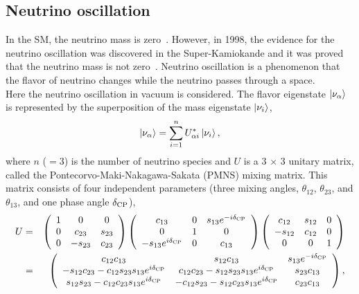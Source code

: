 \subsection{Neutrino oscillation}
\vs\hs In the SM, the neutrino mass is zero~\cite{2022Workman}.
However, in 1998, the evidence for the neutrino oscillation was discovered in the Super-Kamiokande and it was proved that the neutrino mass is not zero~\cite{1998Fukuda}.
Neutrino oscillation is a phenomenon that the flavor of neutrino changes while the neutrino passes through a space.\\
\hs Here the neutrino oscillation in vacuum is considered.
The flavor eigenstate $\ket{\nu_{\alpha}}$ is represented by the superposition of the mass eigenstate $\ket{\nu_{i}}$,
\begin{eqnarray}
	\ket{\nu_{\alpha}}=\sum_{i=1}^{n} U_{\alpha i}^{*}\ket{\nu_{i}},
\end{eqnarray}
where $n$ ($=3$) is the number of neutrino species and $U$ is a 3$\,\times\,$3 unitary matrix, called the Pontecorvo-Maki-Nakagawa-Sakata (PMNS) mixing matrix.
This matrix consists of four independent parameters (three mixing angles, $\theta_{12}$, $\theta_{23}$, and $\theta_{13}$, and one phase angle $\delta_{{\rm CP}}$),
\begin{eqnarray}
	U&=&\left(
	\begin{array}{ccc}
		1&0&0\\
		0&c_{23}&s_{23}\\
		0&-s_{23}&c_{23}
	\end{array}
	\right)
	\left(
	\begin{array}{ccc}
		c_{13}&0&s_{13}e^{-i\delta_{{\rm CP}}}\\
		0&1&0\\
		-s_{13}e^{i\delta_{{\rm CP}}}&0&c_{13}
	\end{array}
	\right)
	\left(
	\begin{array}{ccc}
		c_{12}&s_{12}&0\\
		-s_{12}&c_{12}&0\\
		0&0&1
	\end{array}
	\right) \nonumber \\
	&=&\left(
	\begin{array}{ccc}
		c_{12}c_{13}&s_{12}c_{13}&s_{13}e^{-i\delta_{{\rm CP}}}\\
		-s_{12}c_{23}-c_{12}s_{23}s_{13}e^{i\delta_{{\rm CP}}}&c_{12}c_{23}-s_{12}s_{23}s_{13}e^{i\delta_{{\rm CP}}}&s_{23}c_{13}\\
		s_{12}s_{23}-c_{12}c_{23}s_{13}e^{i\delta_{{\rm CP}}}&-c_{12}s_{23}-s_{12}c_{23}s_{13}e^{i\delta_{{\rm CP}}}&c_{23}c_{13}
	\end{array}
	\right),
\end{eqnarray}
